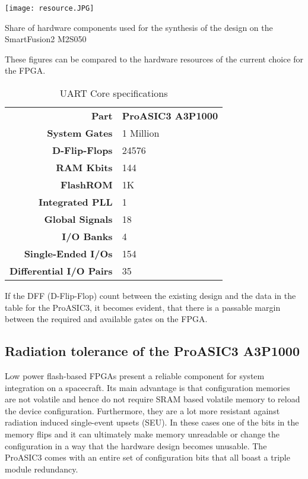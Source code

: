 \begin{table}[H]
	\centering
    \texttt{[image: resource.JPG]}
    \caption[Components]{Share of hardware components used for the synthesis of the design on the SmartFusion2 M2S050}
	\label{tab:resource}
\end{table}

These figures can be compared to the hardware resources of the current choice for the FPGA.

\begin{table}[H]

\caption[]{UART Core specifications \cite{Actel}}
    \label{tab:11}
    
  \begin{center}  
  \begin{tabular}{|r|l|}
  \hline
  \textbf{Part}  & \textbf{ProASIC3 A3P1000} \\ \cline{1-2}
  
  \textbf{System Gates} & 1 Million \\
  \textbf{D-Flip-Flops} & 24576\\ 
  \textbf{RAM Kbits} & 144 \\
  \textbf{FlashROM} & 1K\\
  \textbf{Integrated PLL} & 1 \\
  \textbf{Global Signals} & 18 \\
  \textbf{I/O Banks} & 4 \\
  \textbf{Single-Ended I/Os} & 154 \\
  \textbf{Differential I/O Pairs} & 35 \\
  \hline
  
\end{tabular}
\end{center}
\end{table}

If the DFF (D-Flip-Flop) count between the existing design and the data in the table for the ProASIC3, it becomes evident, that there is a passable margin between the required and available gates on the FPGA.


\subsection{Radiation tolerance of the ProASIC3 A3P1000}

Low power flash-based FPGAs present a reliable component for system integration on a spacecraft. Its main advantage is that configuration memories are not volatile and hence do not require SRAM based volatile memory to reload the device configuration. Furthermore, they are a lot more resistant against radiation induced single-event upsets (SEU). In these cases one of the bits in the memory flips and it can ultimately make memory unreadable or change the configuration in a way that the hardware design becomes unusable. 
The ProASIC3 comes with an entire set of configuration bits that all boast a triple module redundancy. 
\newline

